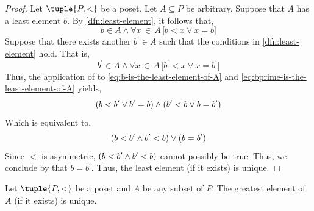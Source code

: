 \begin{proof}
    Let \( \tuple{P, <} \) be a poset. Let \( A \subseteq P \) be arbitrary. Suppose that \( A \) has a least element \( b \).
    By \cref{dfn:least-element}, it follows that,
    \begin{equation}
        \label{eq:b-is-the-least-element-of-A}
        b \in A \land \forall x\,{\in}\,A \, \big[ b < x \lor x = b \big]
    \end{equation}
    Suppose that there exists another \( b^{\prime} \in A \) such that the conditions in \cref{dfn:least-element} hold. That is,
    \begin{equation}
        \label{eq:bprime-is-the-least-element-of-A}
        b^{\prime} \in A \land \forall x\,{\in}\,A \, \big[ b^{\prime} < x \lor x = b^{\prime} \big]
    \end{equation}
    Thus, the application of  to \eqref{eq:b-is-the-least-element-of-A} and \eqref{eq:bprime-is-the-least-element-of-A}
    yields,
    \begin{equation*}
        \mleft( b < b^{\prime} \lor b^{\prime} = b \mright)
        \land
        \mleft( b^{\prime} < b \lor b = b^{\prime} \mright)
    \end{equation*}
    Which is equivalent to,
    \begin{equation*}
        \mleft( b < b^{\prime} \land b^{\prime} < b \mright) \lor \mleft( b = b^{\prime} \mright)
    \end{equation*}
    Since \( < \) is asymmetric, \( \mleft( b < b^{\prime} \land b^{\prime} < b \mright) \) cannot possibly be true. Thus, we conclude
    by  that \( b = b^{\prime} \). Thus, the least element (if it exists) is unique.
\end{proof}

\begin{thm}
    \label{thm:uniqueness-of-greatest-element}
    Let \( \tuple{P, <} \) be a poset and \( A \) be any subset of \( P \). The greatest element of \( A \) (if it exists) is unique.
\end{thm}

